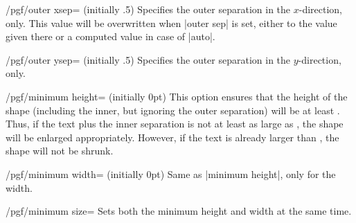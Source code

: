 \begin{key}{/pgf/outer xsep= (initially .5\string\pgflinewidth)}
  Specifies the outer separation in the $x$-direction, only. This
  value will be overwritten when |outer sep| is set, either to the
  value given there or a computed value in case of |auto|.
\end{key}

\begin{key}{/pgf/outer ysep= (initially .5\string\pgflinewidth)}
  Specifies the outer separation in the $y$-direction, only.
\end{key}


\begin{key}{/pgf/minimum height= (initially 0pt)}
  This option ensures that the height of the shape (including the
  inner, but ignoring the outer separation) will be at least
  . Thus, if the text plus the inner separation is not
  at least as large as , the shape will be enlarged
  appropriately. However, if the text is already larger than
  , the shape will not be shrunk.
\begin{codeexample}[]
\end{codeexample}
\end{key}

\begin{key}{/pgf/minimum width= (initially 0pt)}
  Same as |minimum height|, only for the width.
\begin{codeexample}[]
\end{codeexample}
\end{key}

\begin{key}{/pgf/minimum size=}
  Sets both the minimum height and width at the same time.
\begin{codeexample}[]
\end{codeexample}
\end{key}

